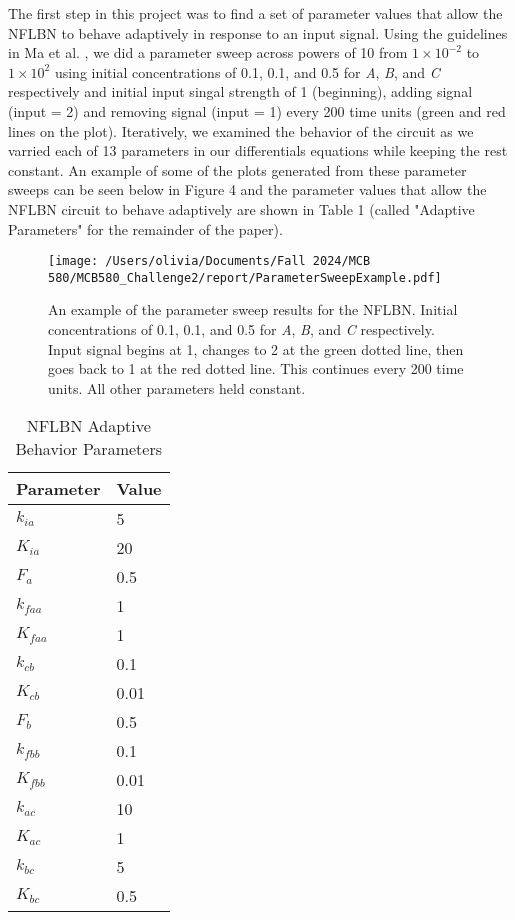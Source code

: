 \documentclass{article}
\begin{document}
The first step in this project was to find a set of parameter values that allow the NFLBN to behave adaptively in response to an input signal. Using the guidelines in Ma et al. \cite{challenge2paperD2L}, we did a parameter sweep across powers of 10 from $1 \times 10^{-2}$ to $1 \times 10^{2}$ using initial concentrations of 0.1, 0.1, and 0.5 for \textit{A}, \textit{B}, and \textit{C} respectively and initial input singal strength of 1 (beginning), adding signal (input = 2) and removing signal (input = 1) every 200 time units (green and red lines on the plot). Iteratively, we examined the behavior of the circuit as we varried each of 13 parameters in our differentials equations while keeping the rest constant. An example of some of the plots generated from these parameter sweeps can be seen below in Figure 4 and the parameter values that allow the NFLBN circuit to behave adaptively are shown in Table 1 (called "Adaptive Parameters" for the remainder of the paper). 

\begin{figure}[H]
    \centering
    \texttt{[image: /Users/olivia/Documents/Fall 2024/MCB 580/MCB580\_Challenge2/report/ParameterSweepExample.pdf]}
    \caption{An example of the parameter sweep results for the NFLBN. Initial concentrations of 0.1, 0.1, and 0.5 for \textit{A}, \textit{B}, and \textit{C} respectively. Input signal begins at 1, changes to 2 at the green dotted line, then goes back to 1 at the red dotted line. This continues every 200 time units. All other parameters held constant.}
    \label{fig:4}
\end{figure}

\begin{table}[h]
    \centering
    \caption{NFLBN Adaptive Behavior Parameters}
    \begin{tabular}{@{}ll@{}}
        \toprule
        Parameter & Value \\ 
        \midrule
        \(k_{ia}\) & 5 \\
        \(K_{ia}\) & 20 \\
        \(F_a\) & 0.5 \\
        \(k_{faa}\) & 1 \\
        \(K_{faa}\) & 1 \\
        \(k_{cb}\) & 0.1 \\
        \(K_{cb}\) & 0.01 \\
        \(F_b\) & 0.5 \\
        \(k_{fbb}\) & 0.1 \\
        \(K_{fbb}\) & 0.01 \\
        \(k_{ac}\) & 10 \\
        \(K_{ac}\) & 1 \\
        \(k_{bc}\) & 5 \\
        \(K_{bc}\) & 0.5 \\
        \bottomrule
    \end{tabular}
    \label{tab:parameters}
\end{table}
\end{document}
